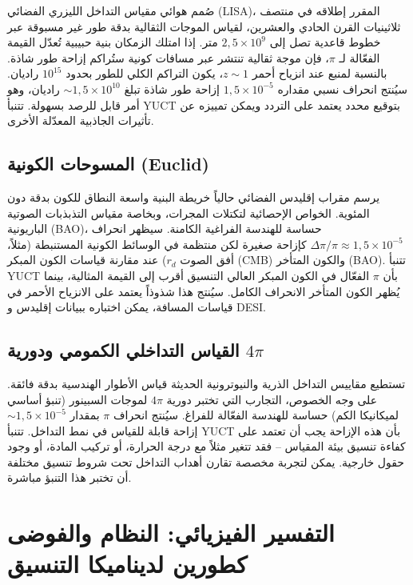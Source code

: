 \documentclass[12pt,a4paper]{article}
\begin{document}
	صُمم هوائي مقياس التداخل الليزري الفضائي (LISA)، المقرر إطلاقه في منتصف ثلاثينيات القرن الحادي والعشرين، لقياس الموجات الثقالية بدقة طور غير مسبوقة عبر خطوط قاعدية تصل إلى \(2{,}5\times10^9\) متر. إذا امتلك الزمكان بنية حبيبية تُعدّل القيمة الفعّالة لـ \(\pi\)، فإن موجة ثقالية تنتشر عبر مسافات كونية ستُراكم إزاحة طور شاذة. بالنسبة لمنبع عند انزياح أحمر \(z \sim 1\)، يكون التراكم الكلي للطور بحدود \(10^{15}\) راديان. سيُنتج انحراف نسبي مقداره \(1{,}5\times10^{-5}\) إزاحة طور شاذة تبلغ \(\sim 1{,}5\times10^{10}\) راديان، وهو أمر قابل للرصد بسهولة. تتنبأ YUCT بتوقيع محدد يعتمد على التردد ويمكن تمييزه عن تأثيرات الجاذبية المعدّلة الأخرى.
	
	\subsection{المسوحات الكونية (Euclid)}
	
	يرسم مقراب إقليدس الفضائي حالياً خريطة البنية واسعة النطاق للكون بدقة دون المئوية. الخواص الإحصائية لتكتلات المجرات، وبخاصة مقياس التذبذبات الصوتية الباريونية (BAO)، حساسة للهندسة الفراغية الكامنة. سيظهر انحراف \(\Delta\pi/\pi \approx 1{,}5\times10^{-5}\) كإزاحة صغيرة لكن منتظمة في الوسائط الكونية المستنبطة (مثلاً، أفق الصوت \(r_d\)) عند مقارنة قياسات الكون المبكر (CMB) والكون المتأخر (BAO). تتنبأ YUCT بأن \(\pi\) الفعّال في الكون المبكر العالي التنسيق أقرب إلى القيمة المثالية، بينما يُظهر الكون المتأخر الانحراف الكامل. سيُنتج هذا شذوذاً يعتمد على الانزياح الأحمر في قياسات المسافة، يمكن اختباره ببيانات إقليدس و DESI.
	
	\subsection{القياس التداخلي الكمومي ودورية \(4\pi\)}
	
	تستطيع مقاييس التداخل الذرية والنيوترونية الحديثة قياس الأطوار الهندسية بدقة فائقة. على وجه الخصوص، التجارب التي تختبر دورية \(4\pi\) لموجات السبينور (تنبؤ أساسي لميكانيكا الكم) حساسة للهندسة الفعّالة للفراغ. سيُنتج انحراف \(\pi\) بمقدار \(\sim 1{,}5\times10^{-5}\) إزاحة قابلة للقياس في نمط التداخل. تتنبأ YUCT بأن هذه الإزاحة يجب أن تعتمد على كفاءة تنسيق بيئة المقياس – فقد تتغير مثلاً مع درجة الحرارة، أو تركيب المادة، أو وجود حقول خارجية. يمكن لتجربة مخصصة تقارن أهداب التداخل تحت شروط تنسيق مختلفة أن تختبر هذا التنبؤ مباشرة.
	
	\section{التفسير الفيزيائي: النظام والفوضى كطورين لديناميكا التنسيق}
	
\end{document}
